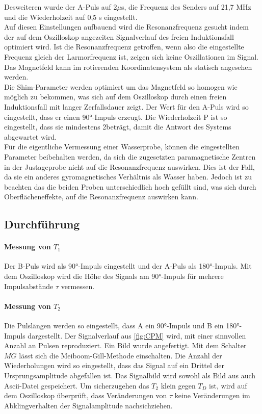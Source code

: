 Desweiteren wurde der A-Puls auf 2$\mu$s, die Frequenz des Senders auf 21,7 MHz und die
Wiederholzeit auf 0,5 s eingestellt.\\
Auf diesen Einstellungen aufbauend wird die Resonanzfrequenz gesucht indem
der auf dem Oszilloskop angezeiten Signalverlauf des freien Induktionsfall optimiert
wird. Ist die Resonanzfrequenz getroffen, wenn also die eingestellte Frequenz gleich
der Larmorfrequenz ist, zeigen sich keine Oszillationen im Signal. Das Magnetfeld
kann im rotierenden Koordinatensystem als statisch angesehen werden.\\
Die Shim-Parameter werden optimiert um das Magnetfeld so homogen wie möglich zu bekommen,
was sich auf dem Oszilloskop durch einen freien Induktionsfall mit langer Zerfallsdauer
zeigt. Der Wert für den A-Puls wird so eingestellt, dass er einen 90°-Impuls
erzeugt. Die Wiederholzeit P  ist so eingestellt, dass sie mindestens 2\tau beträgt,
damit die Antwort des Systems abgewartet wird.\\
Für die eigentliche Vermessung einer Wasserprobe, können die eingestellten Parameter
beibehalten werden, da sich die zugesetzten paramagnetische Zentren in der
Justageprobe nicht auf die Resonanzfrequenz auswirken. Dies ist der Fall,
da sie ein anderes gyromagnetisches Verhältnis als Wasser haben. Jedoch ist
zu beachten das die beiden Proben unterschiedlich hoch gefüllt sind, was sich durch
Oberflächeneffekte, auf die Resonanzfrequenz auswirken kann.
\subsection{Durchführung}
\paragraph{Messung von $T_1$} Der B-Puls wird als 90°-Impuls eingestellt und
der A-Puls als 180°-Impuls. Mit dem Oszilloskop wird die Höhe des Signals am
90°-Impuls für mehrere Impulsabstände $\tau$ vermessen.
\paragraph{Messung von $T_2$}
Die Pulslängen werden so eingestellt, dass A ein 90°-Impuls und B ein 180°-Impuls
dargestellt. Der Signalverlauf aus \ref{fig:CPM} wird, mit einer sinnvollen
Anzahl an Pulsen reproduziert. Ein Bild wurde angefertigt.
Mit dem Schalter $MG$ lässt sich die Meiboom-Gill-Methode einschalten. Die Anzahl
der Wiederholungen wird so eingestellt, dass das Signal auf ein Drittel
der Ursprungsamplitude abgefallen ist. Das Signalbild wird
sowohl als Bild aus auch Ascii-Datei gespeichert. Um sicherzugehen
das $T_2$ klein gegen $T_D$ ist, wird auf dem Oszilloskop überprüft, dass Veränderungen
von $\tau$ keine Veränderungen im Abklingverhalten der Signalamplitude nachsichziehen.
